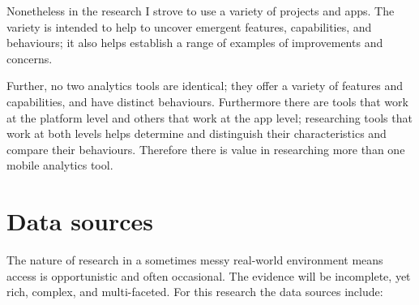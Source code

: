 Nonetheless in the research I strove to use a variety of projects and apps. The variety is intended to help to uncover emergent features, capabilities, and behaviours; it also helps establish a range of examples of improvements and concerns. 

Further, no two analytics tools are identical; they offer a variety of features and capabilities, and have distinct behaviours.  Furthermore there are tools that work at the platform level and others that work at the app level; researching tools that work at both levels helps determine and distinguish their characteristics and compare their behaviours. Therefore there is value in researching more than one mobile analytics tool.

\section{Data sources}
The nature of research in a sometimes messy real-world environment means access is opportunistic and often occasional. The evidence will be incomplete, yet rich, complex, and multi-faceted. For this research the data sources include:

